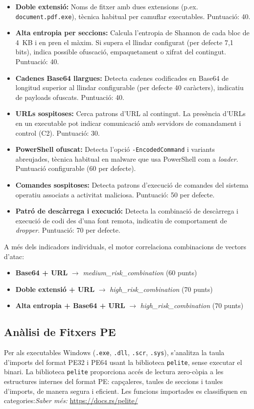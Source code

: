 \documentclass[12pt,a4paper]{report}
\begin{document}
\begin{itemize}
    \item \textbf{Doble extensió:} Noms de fitxer amb dues extensions (p.ex. \texttt{document.pdf.exe}), tècnica habitual per camuflar executables. Puntuació: 40.
    \item \textbf{Alta entropia per seccions:} Calcula l'entropia de Shannon de cada bloc de 4~KB i en pren el màxim. Si supera el llindar configurat (per defecte 7,1 bits), indica possible ofuscació, empaquetament o xifrat del contingut. Puntuació: 40.
    \item \textbf{Cadenes Base64 llargues:} Detecta cadenes codificades en Base64 de longitud superior al llindar configurable (per defecte 40 caràcters), indicatiu de payloads ofuscats. Puntuació: 40.
    \item \textbf{URLs sospitoses:} Cerca patrons d'URL al contingut. La presència d'URLs en un executable pot indicar comunicació amb servidors de comandament i control (C2). Puntuació: 30.
    \item \textbf{PowerShell ofuscat:} Detecta l'opció \texttt{-EncodedCommand} i variants abreujades, tècnica habitual en malware que usa PowerShell com a \textit{loader}. Puntuació configurable (60 per defecte).
    \item \textbf{Comandes sospitoses:} Detecta patrons d'execució de comandes del sistema operatiu associats a activitat maliciosa. Puntuació: 50 per defecte.
    \item \textbf{Patró de descàrrega i execució:} Detecta la combinació de descàrrega i execució de codi des d'una font remota, indicatiu de comportament de \textit{dropper}. Puntuació: 70 per defecte.
\end{itemize}

A més dels indicadors individuals, el motor correlaciona combinacions de vectors d'atac:
\begin{itemize}
    \item \textbf{Base64 + URL} $\to$ \textit{medium\_risk\_combination} (60 punts)
    \item \textbf{Doble extensió + URL} $\to$ \textit{high\_risk\_combination} (70 punts)
    \item \textbf{Alta entropia + Base64 + URL} $\to$ \textit{high\_risk\_combination} (70 punts)
\end{itemize}

\subsection{Anàlisi de Fitxers PE}
Per als executables Windows (\texttt{.exe}, \texttt{.dll}, \texttt{.scr}, \texttt{.sys}), s'analitza la taula d'imports del format PE32 i PE64 usant la biblioteca \texttt{pelite}, sense executar el binari. La biblioteca \texttt{pelite} proporciona accés de lectura zero-còpia a les estructures internes del format PE: capçaleres, taules de seccions i taules d'imports, de manera segura i eficient. Les funcions importades es classifiquen en categories:\textit{Saber més:} \url{https://docs.rs/pelite/}
\end{document}
